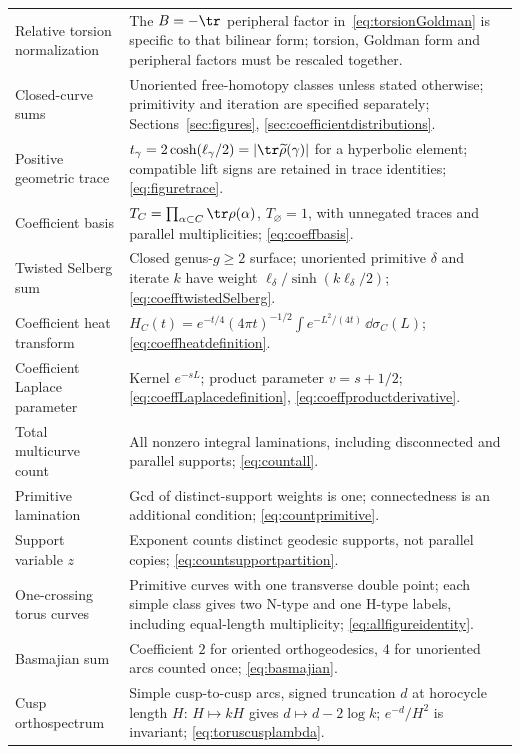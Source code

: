 \begin{longtable}{@{}>{\raggedright\arraybackslash}p{}
 >{\raggedright\arraybackslash}p{}@{}}
Relative torsion normalization & The $B=-\tr$ peripheral factor in~\eqref{eq:torsionGoldman} is specific to that bilinear form; torsion, Goldman form and peripheral factors must be rescaled together.\\
Closed-curve sums & Unoriented free-homotopy classes unless stated otherwise; primitivity and iteration are specified separately; Sections~\ref{sec:figures}, \ref{sec:coefficientdistributions}.\\
Positive geometric trace & $t_\gamma=2\cosh(\ell_\gamma/2)=|\tr\widetilde\rho(\gamma)|$ for a hyperbolic element; compatible lift signs are retained in trace identities; \eqref{eq:figuretrace}.\\
Coefficient basis & $T_C=\prod_{\alpha\subset C}\tr\rho(\alpha)$, $T_\varnothing=1$, with unnegated traces and parallel multiplicities; \eqref{eq:coeffbasis}.\\
Twisted Selberg sum & Closed genus-$g\ge2$ surface; unoriented primitive $\delta$ and iterate $k$ have weight $\ell_\delta/\sinh(k\ell_\delta/2)$; \eqref{eq:coefftwistedSelberg}.\\
Coefficient heat transform & $H_C(t)=e^{-t/4}(4\pi t)^{-1/2}\int e^{-L^2/(4t)}\,\dd\sigma_C(L)$; \eqref{eq:coeffheatdefinition}.\\
Coefficient Laplace parameter & Kernel $e^{-sL}$; product parameter $v=s+1/2$; \eqref{eq:coeffLaplacedefinition}, \eqref{eq:coeffproductderivative}.\\
Total multicurve count & All nonzero integral laminations, including disconnected and parallel supports; \eqref{eq:countall}.\\
Primitive lamination & Gcd of distinct-support weights is one; connectedness is an additional condition; \eqref{eq:countprimitive}.\\
Support variable $z$ & Exponent counts distinct geodesic supports, not parallel copies; \eqref{eq:countsupportpartition}.\\
One-crossing torus curves & Primitive curves with one transverse double point; each simple class gives two N-type and one H-type labels, including equal-length multiplicity; \eqref{eq:allfigureidentity}.\\
Basmajian sum & Coefficient $2$ for oriented orthogeodesics, $4$ for unoriented arcs counted once; \eqref{eq:basmajian}.\\
Cusp orthospectrum & Simple cusp-to-cusp arcs, signed truncation $d$ at horocycle length $H$: $H\mapsto kH$ gives $d\mapsto d-2\log k$; $e^{-d}/H^2$ is invariant; \eqref{eq:toruscusplambda}.\\

\end{longtable}
